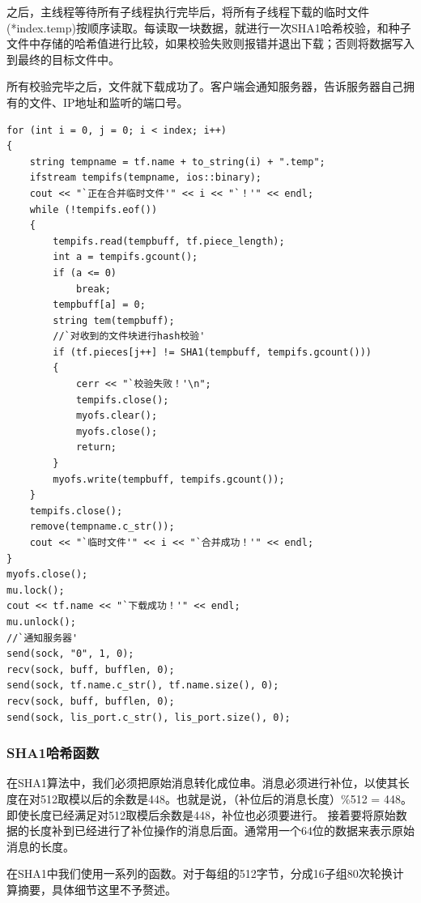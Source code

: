 \documentclass[thesis]{thesis}
\begin{document}
	之后，主线程等待所有子线程执行完毕后，将所有子线程下载的临时文件(*index.temp)按顺序读取。每读取一块数据，就进行一次SHA1哈希校验，和种子文件中存储的哈希值进行比较，如果校验失败则报错并退出下载；否则将数据写入到最终的目标文件中。
	
	所有校验完毕之后，文件就下载成功了。客户端会通知服务器，告诉服务器自己拥有的文件、IP地址和监听的端口号。
\begin{lstlisting}
for (int i = 0, j = 0; i < index; i++)
{
	string tempname = tf.name + to_string(i) + ".temp";
	ifstream tempifs(tempname, ios::binary);
	cout << "`正在合并临时文件'" << i << "`！'" << endl;
	while (!tempifs.eof())
	{
		tempifs.read(tempbuff, tf.piece_length);
		int a = tempifs.gcount();
		if (a <= 0)
			break;
		tempbuff[a] = 0;
		string tem(tempbuff);
		//`对收到的文件块进行hash校验'
		if (tf.pieces[j++] != SHA1(tempbuff, tempifs.gcount()))
		{
			cerr << "`校验失败！'\n";
			tempifs.close();
			myofs.clear();
			myofs.close();
			return;
		}
		myofs.write(tempbuff, tempifs.gcount());
	}
	tempifs.close();
	remove(tempname.c_str());
	cout << "`临时文件'" << i << "`合并成功！'" << endl;
}
myofs.close();
mu.lock();
cout << tf.name << "`下载成功！'" << endl;
mu.unlock();
//`通知服务器'
send(sock, "0", 1, 0);
recv(sock, buff, bufflen, 0);
send(sock, tf.name.c_str(), tf.name.size(), 0);
recv(sock, buff, bufflen, 0);
send(sock, lis_port.c_str(), lis_port.size(), 0);
\end{lstlisting}
	
	\subsubsection{SHA1哈希函数}
	在SHA1算法中，我们必须把原始消息转化成位串。消息必须进行补位，以使其长度在对512取模以后的余数是448。也就是说，（补位后的消息长度）\%512 = 448。即使长度已经满足对512取模后余数是448，补位也必须要进行。
	接着要将原始数据的长度补到已经进行了补位操作的消息后面。通常用一个64位的数据来表示原始消息的长度。
	
	在SHA1中我们使用一系列的函数。对于每组的512字节，分成16子组80次轮换计算摘要，具体细节这里不予赘述。
	
\end{document}
